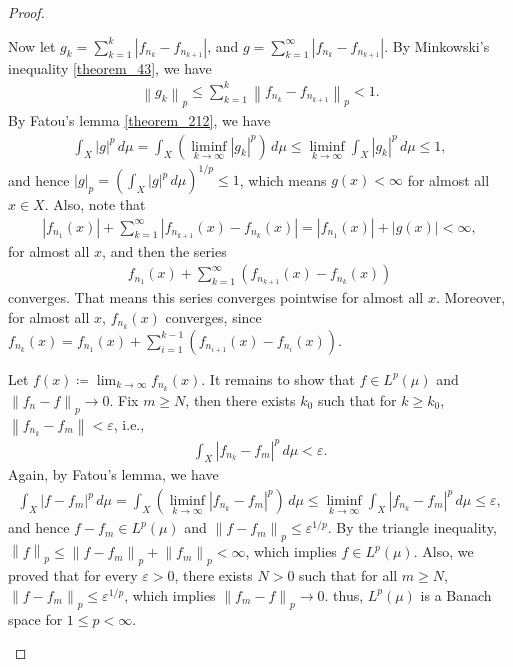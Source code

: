 \documentclass[11pt]{book}
\theoremstyle{definition}
\numberwithin{equation}{chapter}
\begin{document}
\begin{proof}
\begin{enumerate}[label=(\alph*)]
    Now let $g_k = \sum^k_{k=1} \left|f_{n_k} - f_{n_{k+1}}\right|$, and $g = \sum^\infty_{k=1} \left|f_{n_k} - f_{n_{k+1}}\right|$. By Minkowski's inequality \ref{theorem_43}, we have
    \begin{align*}
        \left\|g_k\right\|_p \leq \sum^k_{k=1} \left\|f_{n_k} - f_{n_{k+1}}\right\|_p < 1.
    \end{align*}
    By Fatou's lemma \ref{theorem_212}, we have
    \begin{align*}
        \int_X \left|g\right|^p\,d\mu = \int_X \left(\liminf_{k\to\infty} \left|g_k\right|^p\right) \,d\mu \leq \liminf_{k\to\infty} \int_X \left|g_k\right|^p\,d\mu \leq 1,
    \end{align*}
    and hence $\left|g\right|_p = \left(\int_X \left|g\right|^p\,d\mu\right)^{1/p} \leq 1$, which means $g(x) < \infty$ for almost all $x \in X$. Also, note that
    \begin{align*}
        \left|f_{n_1}(x)\right| + \sum^\infty_{k=1} \left|f_{n_{k+1}}(x) - f_{n_k}(x)\right| = \left|f_{n_1}(x)\right| + \left|g(x)\right| < \infty,
    \end{align*}
    for almost all $x$, and then the series
    \begin{align*}
        f_{n_1}(x) + \sum^\infty_{k=1} \left(f_{n_{k+1}}(x) - f_{n_k}(x)\right)
    \end{align*}
    converges. That means this series converges pointwise for almost all $x$. Moreover, for almost all $x$, $f_{n_k}(x)$ converges, since $f_{n_k}(x) = f_{n_1}(x) + \sum^{k-1}_{i=1} \left(f_{n_{i+1}}(x) - f_{n_i}(x)\right)$. 

    Let $f(x) \coloneqq \lim_{k\to\infty} f_{n_k}(x)$. It remains to show that $f \in L^p(\mu)$ and $\left\|f_n - f\right\|_p \to 0$. Fix $m \geq N$, then there exists $k_0$ such that for $k \geq k_0$, $\left\|f_{n_k} - f_m \right\| < \varepsilon$, i.e.,
    \begin{align*}
        \int_X \left|f_{n_k} - f_m \right|^p \,d\mu < \varepsilon.
    \end{align*}
    Again, by Fatou's lemma, we have
    \begin{align*}
        \int_X \left|f - f_m \right|^p \,d\mu = \int_X \left(\liminf_{k\to\infty} \left|f_{n_k} - f_m \right|^p \right) \,d\mu \leq \liminf_{k\to\infty} \int_X \left|f_{n_k} - f_m \right|^p \,d\mu \leq \varepsilon,
    \end{align*}
    and hence $f - f_m \in L^p(\mu)$ and $\left\|f - f_m \right\|_p \leq \varepsilon^{1/p}$. By the triangle inequality, $\left\|f\right\|_p \leq \left\|f - f_m \right\|_p + \left\|f_m \right\|_p < \infty$, which implies $f \in L^p(\mu)$. Also, we proved that for every $\varepsilon > 0$, there exists $N > 0$ such that for all $m \geq N$, $\left\|f - f_m \right\|_p \leq \varepsilon^{1/p}$, which implies $\left\|f_m - f\right\|_p \to 0$. thus, $L^p(\mu)$ is a Banach space for $1 \leq p < \infty$.
    

\end{enumerate}
\end{proof}
\end{document}
